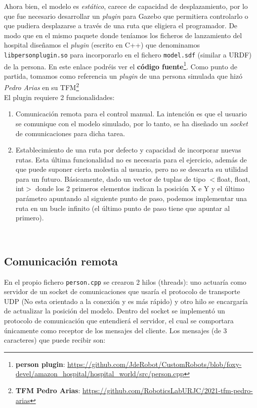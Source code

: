 Ahora bien, el modelo es \textit{estático}, carece de capacidad de desplazamiento, por lo que fue necesario desarrollar un \textit{plugin} para Gazebo que permitiera controlarlo o que pudiera desplazarse a través de una ruta que eligiera el programador. De modo que en el mismo paquete donde teníamos los ficheros de lanzamiento del hospital diseñamos el \textit{plugin} (escrito en C++) que denominamos \texttt{libpersonplugin.so} para incorporarlo en el fichero \texttt{model.sdf} (similar a URDF) de la persona. En este enlace podréis ver el \textbf{código fuente}\footnote{\textbf{person plugin}: \url{https://github.com/JdeRobot/CustomRobots/blob/foxy-devel/amazon_hospital/hospital_world/src/person.cpp}}. Como punto de partida, tomamos como referencia un \textit{plugin} de una persona simulada que hizó \textit{Pedro Arias} en su TFM\footnote{\textbf{TFM Pedro Arias}: \url{https://github.com/RoboticsLabURJC/2021-tfm-pedro-arias}}\\

El plugin requiere 2 funcionalidades:
\begin{enumerate}
	\item Comunicación remota para el control manual. La intención es que el usuario se comunique con el modelo simulado, por lo tanto, se ha diseñado un \textit{socket} de comunicaciones para dicha tarea.
	\item Establecimiento de una ruta por defecto y capacidad de incorporar nuevas rutas. Esta última funcionalidad no es necesaria para el ejercicio, además de que puede suponer cierta molestia al usuario, pero no se descarta su utilidad para un futuro. Básicamente, dado un vector de tuplas de tipo $<$float, float, int$>$ donde los 2 primeros elementos indican la posición X e Y y el último parámetro apuntando al siguiente punto de paso, podemos implementar una ruta en un bucle infinito (el último punto de paso tiene que apuntar al primero).
\end{enumerate}\




\subsection{Comunicación remota}
\label{subsec:comunicacion_remota}

En el propio fichero \texttt{person.cpp} se crearon 2 hilos (threads): uno actuaría como servidor de un socket de comunicaciones que usaría el protocolo de transporte UDP (No esta orientado a la conexión y es más rápido) y otro hilo se encargaría de actualizar la posición del modelo. Dentro del socket se implementó un protocolo de comunicación que entendierá el servidor, el cual se comportara únicamente como receptor de los mensajes del cliente. Los mensajes (de 3 caracteres) que puede recibir son:\\

